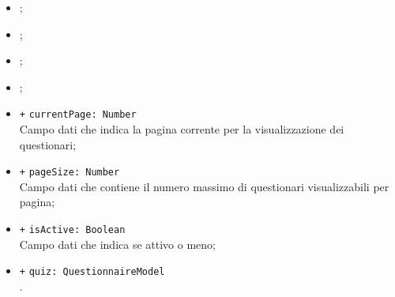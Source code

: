 \begin{itemize}
\begin{itemize}
		\item \rootscopeA;
		\item \routeparamsA;
		\item \errorinfomodelA;
		\item \locationA;
		\item \texttt{+} \texttt{currentPage: Number} \\ Campo dati che indica la pagina corrente per la visualizzazione dei questionari;
		\item \texttt{+} \texttt{pageSize: Number} \\Campo dati che contiene il numero massimo di questionari visualizzabili per pagina;
		\item \texttt{+} \texttt{isActive: Boolean} \\Campo dati che indica se attivo o meno;
		\item \texttt{+} \texttt{quiz: QuestionnaireModel} \\.


\end{itemize}
\end{itemize}

